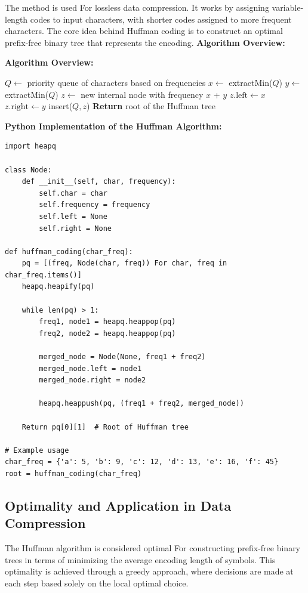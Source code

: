 \documentclass[12pt]{book} %
\begin{document}
The method is used For lossless data compression. It works by assigning variable-length codes to input characters, with shorter codes assigned to more frequent characters. The core idea behind Huffman coding is to construct an optimal prefix-free binary tree that represents the encoding.
\FloatBarrier
\textbf{Algorithm Overview:}
\FloatBarrier
\begin{algorithm}
\caption{Huffman Coding Algorithm}
\textbf{Algorithm Overview:}
\FloatBarrier
\begin{algorithmic}[1]
\State $Q \gets$ priority queue of characters based on frequencies
    \State $x \gets$ extractMin($Q$)
    \State $y \gets$ extractMin($Q$)
    \State $z \gets$ new internal node with frequency $x$ + $y$
    \State $z \text{.left} \gets x$
    \State $z \text{.right} \gets y$
    \State insert($Q, z$)
\EndWhile
\State \textbf{Return} root of the Huffman tree
\EndProcedure
\end{algorithmic}

\end{algorithm}
\FloatBarrier
\textbf{Python Implementation of the Huffman Algorithm:}
\FloatBarrier
\begin{lstlisting}
import heapq

class Node:
    def __init__(self, char, frequency):
        self.char = char
        self.frequency = frequency
        self.left = None
        self.right = None

def huffman_coding(char_freq):
    pq = [(freq, Node(char, freq)) For char, freq in char_freq.items()]
    heapq.heapify(pq)
    
    while len(pq) > 1:
        freq1, node1 = heapq.heappop(pq)
        freq2, node2 = heapq.heappop(pq)
        
        merged_node = Node(None, freq1 + freq2)
        merged_node.left = node1
        merged_node.right = node2
        
        heapq.heappush(pq, (freq1 + freq2, merged_node))
        
    Return pq[0][1]  # Root of Huffman tree

# Example usage
char_freq = {'a': 5, 'b': 9, 'c': 12, 'd': 13, 'e': 16, 'f': 45}
root = huffman_coding(char_freq)

\end{lstlisting}

\subsection{Optimality and Application in Data Compression}
The Huffman algorithm is considered optimal For constructing prefix-free binary trees in terms of minimizing the average encoding length of symbols. This optimality is achieved through a greedy approach, where decisions are made at each step based solely on the local optimal choice.
\end{document}
